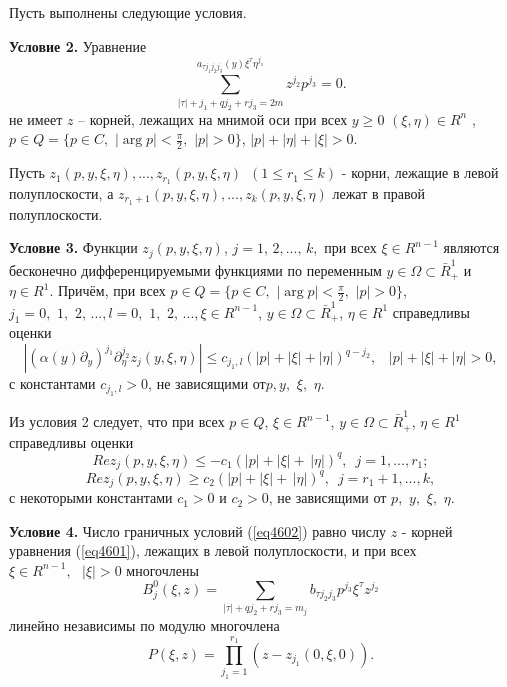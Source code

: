 Пусть выполнены следующие условия.

\textbf{Условие 2.} Уравнение
\[
\sum\limits_{\left| \tau \right| + j_1 + qj_2 + rj_3 = 2m}^ {a_{\tau j_1 j_2
j_3 } (y)\xi ^\tau \eta ^{j_1 }} z^{j_2 }p^{j_3 } = 0.
\]
не имеет $z$ -- корней, лежащих на мнимой оси при всех $y \geqslant 0\,\,(\xi
,\eta ) \in R^n\,\,$, $p \in Q = \{p \in C,\,\,\left| {\arg p} \right| <
\frac{\pi }{2},\,\,\left| p \right| > 0\}$, $\left| p \right| + \left| \eta
\right| + \left| \xi \right| > 0$.

Пусть $z_1 (p,y,\xi ,\eta ),...,z_{r_1 } (p,y,\xi ,\eta )\,\,\,(1 \leqslant r_1
\leqslant k)$ - корни, лежащие в левой полуплоскости, а $z_{r_1 + 1} (p,y,\xi
,\eta ),...,z_k (p,y,\xi ,\eta )$ лежат в правой полуплоскости.

\textbf{Условие 3.} Функции $z_j (p,y,\xi ,\eta )$, $j = 1,\,2,...,\,k,$ при
всех $\xi \in R^{n - 1}$ являются бесконечно дифференцируемыми функциями по
переменным $y \in \Omega \subset \bar {R}_ + ^1 $ и $\eta \in R^1$. Причём,
при всех $p \in Q = \{p \in C,\,\,\left| {\arg p} \right| < \frac{\pi
}{2},\,\,\left| p \right| > 0\}$, $j_1 = 0,\,\,1,\,\,2,\,...,l =
0,\,\,1,\,\,2,\,...,\xi \in R^{n - 1}$, $y \in \Omega \subset \bar {R}_ +
^1 $, $\eta \in R^1$ справедливы оценки
\[
\left| {(\alpha (y)\partial _y )^{j_1 }\partial _\eta ^{j_2 } z_j (y,\xi
,\eta )} \right| \leqslant c_{j_1 ,l} (\left| p \right| + \left| \xi \right| +
\left| \eta \right|)^{q - j_2 },\,\,\,\,\,\left| p \right| + \left| \xi
\right| + \left| \eta \right| > 0,
\]
с константами $c_{j_1 ,l} > 0$, не зависящими от$p,y,\,\,\xi ,\,\,\eta .$

Из условия 2 следует, что при всех $p \in Q$, $\xi \in R^{n - 1}$, $y \in
\Omega \subset \bar {R}_ + ^1 $, $\eta \in R^1$ справедливы оценки
\[
Rez_j (p,y,\xi ,\eta ) \leqslant - c_1 (\left| p \right| + \left| \xi \right| +
\,\left| \eta \right|)^q,\,\,\,j = 1,...,r_1 ;
\]
\[
Rez_j (p,y,\xi ,\eta ) \geqslant c_2 (\left| p \right| + \left| \xi \right| +
\,\left| \eta \right|)^q,\,\,\,j = r_1 + 1,...,k,
\]
с некоторыми константами $c_1 >0$
и $c_2 > 0$, не зависящими
от $p,\,\,y,\,\,\xi ,\,\,\eta $.

\textbf{Условие 4.} Число граничных условий (\ref{eq4602}) равно числу $z$ - корней
уравнения (\ref{eq4601}), лежащих в левой полуплоскости, и при всех $\xi \in R^{n -
1},\,\,\,\,\left| \xi \right| > 0$ многочлены
$$
	B_j^0 (\xi ,z) =
	\sum\limits_{\left| \tau \right| + qj_2 + rj_3 = m_j } {b_{\tau j_2 j_3 }
	p^{j_3 }} \xi ^\tau z^{j_2 }
$$
линейно независимы по модулю многочлена
$$
P(\xi ,z) = \prod\limits_{j_1 = 1}^{r_1 } {(z - z_{j_1 } (0,\xi ,0))} .
$$

